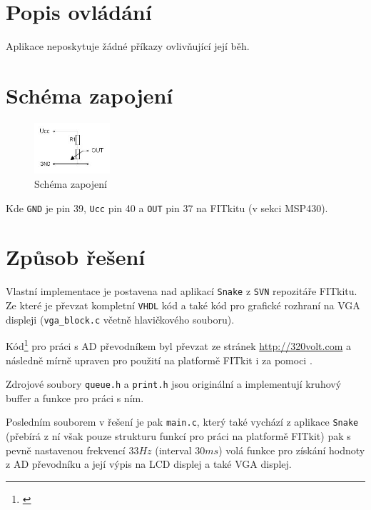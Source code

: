 \documentclass[a4paper, 11pt, titlepage]{article}
\begin{document}
\section{Popis ovládání} %
\label{sec:popis_ovladani}
	Aplikace neposkytuje žádné příkazy ovlivňující její běh. 

\section{Schéma zapojení} %
\label{sec:schema_zapojeni}

	\begin{figure}[htbp]
		\centering
		\includegraphics[width=0.25\textwidth]{img/c.png}
		\caption{Schéma zapojení}
	\end{figure}

			Kde \texttt{GND} je pin 39, \texttt{Ucc} pin 40 a \texttt{OUT} pin 37 na 
			FITkitu (v sekci MSP430). 


\section{Způsob řešení} %
\label{sec:implementace}
	Vlastní implementace je postavena nad aplikací \texttt{Snake} z \texttt{SVN} repozitáře
	FITkitu. Ze které je převzat kompletní \texttt{VHDL} kód a také kód pro grafické
	rozhraní na VGA displeji (\texttt{vga\_block.c} včetně hlavičkového souboru).

	Kód\footnote{\cite{320Volt:SampleCode}} pro práci s AD převodníkem byl 
	převzat ze stránek \url{http://320volt.com}
	a následně mírně upraven pro použití na platformě FITkit \citep{FITkit} i za 
	pomoci \citep{TI:UserGuide}.

	Zdrojové soubory \texttt{queue.h} a \texttt{print.h} jsou originální 
	a implementují kruhový buffer a funkce pro práci s ním.  

	Posledním souborem v řešení je pak \texttt{main.c}, který také vychází z aplikace
	\texttt{Snake} (přebírá z ní však pouze strukturu funkcí pro práci na platformě FITkit) 
	pak s pevně nastavenou frekvencí $33Hz$ (interval $30ms$) volá funkce pro získání
	hodnoty z AD převodníku a její výpis na LCD displej a také VGA displej. 
\end{document}
